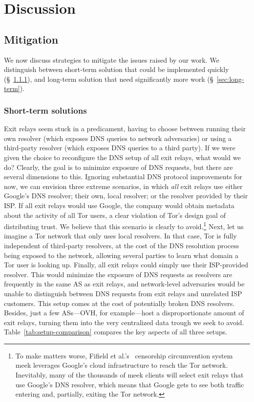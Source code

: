 \section{Discussion}
\label{sec:discussion}

\subsection{Mitigation}
We now discuss strategies to mitigate the issues raised by our work.  We
distinguish between short-term solution that could be implemented quickly
(\S~\ref{sec:short-term}), and long-term solution that need significantly more
work (\S~\ref{sec:long-term}).

\subsubsection{Short-term solutions}
\label{sec:short-term}
Exit relays seem stuck in a predicament, having to choose between running their
own resolver (which exposes DNS queries to network adversaries) or using a
third-party resolver (which exposes DNS queries to a third party).  If we were
given the choice to reconfigure the DNS setup of all exit relays, what would we
do?  Clearly, the goal is to minimize exposure of DNS requests, but there are
several dimensions to this.  Ignoring substantial DNS protocol improvements for
now, we can envision three extreme scenarios, in which \emph{all} exit relays
use either \first Google's DNS resolver; \second their own, local resolver; or
\third the resolver provided by their ISP.  If all exit relays would use Google,
the company would obtain metadata about the activity of all Tor users, a clear
violation of Tor's design goal of distributing trust.  We believe that this
scenario is clearly to avoid.\footnote{To make matters worse, Fifield et
al.'s~\cite{Fifield2015a} censorship circumvention system meek leverages
Google's cloud infrastructure to reach the Tor network.  Inevitably, many of
the thousands of meek clients will select exit relays that use Google's DNS
resolver, which means that Google gets to see both traffic entering and,
partially, exiting the Tor network.} Next, let us imagine a Tor network that
only uses local resolvers.  In that case, Tor is fully independent of
third-party resolvers, at the cost of the DNS resolution process being exposed
to the network, allowing several parties to learn what domain a Tor user is
looking up.  Finally, all exit relays could simply use their ISP-provided
resolver.  This would minimize the exposure of DNS requests as resolvers are
frequently in the same AS as exit relays, and network-level adversaries would be
unable to distinguish between DNS requests from exit relays and unrelated ISP
customers.  This setup comes at the cost of potentially broken DNS resolvers.
Besides, just a few ASs---OVH, for example---host a disproportionate amount of
exit relays, turning them into the very centralized data trough we seek to
avoid.  Table~\ref{tab:setup-comparison} compares the key aspects of all three
setups.

